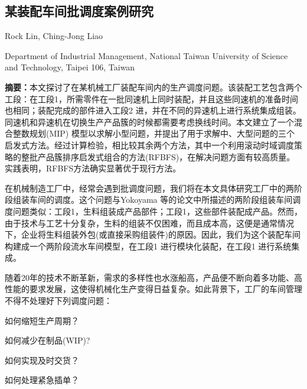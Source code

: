 \begin{Abstract}
\chapter*{某装配车间批调度案例研究}
\begin{center}
\vspace{2mm}
{
 {\xiaosi Rock Lin, Ching-Jong Liao}

 {\xiaowu Department of Industrial Management, National Taiwan University of Science and Technology, Taipei 106, Taiwan}
}
\end{center}
{\songti
\noindent \xiaowu\textbf{摘要：}本文探讨了在某机械工厂装配车间内的生产调度问题。该装配工艺包含两个工段：在工段1，所需零件在一批同速机上同时装配，并且这些同速机的准备时间也相同；装配完成的部件进入工段2 进，并在不同的异速机上进行系统集成组装。同速机和异速机在切换生产产品簇的时候都需要考虑换线时间。本文建立了一个混合整数规划(MIP) 模型以求解小型问题，并提出了用于求解中、大型问题的三个启发式方法。经过计算检验，相比较其余两个方法，其中一个利用滚动时域调度策略的整批产品簇排序启发式组合的方法(RFBFS)，在解决问题方面有较高质量。实践表明，RFBFS方法确实显著优于现行方法。

}
\end{Abstract}
在机械制造工厂中，经常会遇到批调度问题，我们将在本文具体研究工厂中的两阶段组装车间的调度。这个问题与Yokoyama 等的论文中所描述的两阶段组装车间调度问题类似：工段1，生料组装成产品部件；工段1，这些部件装配成产品。然而，由于技术与工艺十分复杂，生料的组装不仅困难，而且成本高，这便是通常情况下，企业将生料组装外包(或直接采购组装件)的原因。因此，我们为这个装配车间构建成一个两阶段流水车间模型，在工段1 进行模块化装配，在工段1 进行系统集成。

随着20年的技术不断革新，需求的多样性也水涨船高，产品便不断向着多功能、高性能的要求发展，这使得机械化生产变得日益复杂。如此背景下，工厂的车间管理不得不处理好下列调度问题：
\begin{compactenum}[(1)]
\item 如何缩短生产周期？
\item 如何减少在制品(WIP)?
\item 如何实现及时交货？
\item 如何处理紧急插单？
\end{compactenum}

